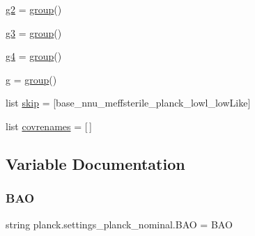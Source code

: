 \begin{DoxyCompactItemize}
\mbox{\hyperlink{namespaceplanck_1_1settings__planck__nominal_a70cdae8fe37fddfafda74329b6c654e2}{g2}} = \mbox{\hyperlink{classplanck_1_1settings__planck__nominal_1_1group}{group}}()
\item 
\mbox{\hyperlink{namespaceplanck_1_1settings__planck__nominal_a0dd39260235a3f69daf16fc6008dafb8}{g3}} = \mbox{\hyperlink{classplanck_1_1settings__planck__nominal_1_1group}{group}}()
\item 
\mbox{\hyperlink{namespaceplanck_1_1settings__planck__nominal_a17d8fe25ace6bf9b49f3b95ae6694739}{g4}} = \mbox{\hyperlink{classplanck_1_1settings__planck__nominal_1_1group}{group}}()
\item 
\mbox{\hyperlink{namespaceplanck_1_1settings__planck__nominal_a71f953101f632b18051dbc854a5c043a}{g}} = \mbox{\hyperlink{classplanck_1_1settings__planck__nominal_1_1group}{group}}()
\item 
list \mbox{\hyperlink{namespaceplanck_1_1settings__planck__nominal_a549171b2d5eb8d97449444c79c998f12}{skip}} = \mbox{[}\textquotesingle{}base\+\_\+nnu\+\_\+meffsterile\+\_\+planck\+\_\+lowl\+\_\+low\+Like\textquotesingle{}\mbox{]}
\item 
list \mbox{\hyperlink{namespaceplanck_1_1settings__planck__nominal_a99170dd71595ee24afecb0f450166da9}{covrenames}} = \mbox{[}$\,$\mbox{]}
\end{DoxyCompactItemize}


\subsection{Variable Documentation}
\mbox{\label{namespaceplanck_1_1settings__planck__nominal_adb348a01bf054af06b580f1735df8de2}} 
\subsubsection{\texorpdfstring{B\+AO}{BAO}}
{\footnotesize\ttfamily string planck.\+settings\+\_\+planck\+\_\+nominal.\+B\+AO = \textquotesingle{}B\+AO\textquotesingle{}}

\mbox{\label{namespaceplanck_1_1settings__planck__nominal_abe836cf536af620f0c0b86090b4155b9}} 
